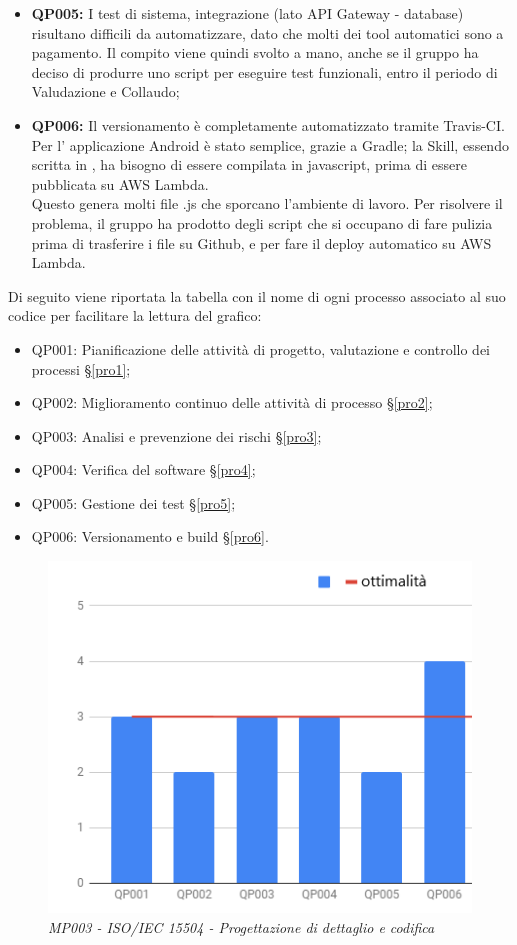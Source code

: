 \begin{itemize}
	\item \textbf{QP005:} I test di sistema, integrazione (lato API Gateway - database) risultano difficili da automatizzare, dato che molti dei tool automatici sono a pagamento. Il compito viene quindi svolto a mano, anche se il gruppo ha deciso di produrre uno script per eseguire test funzionali, entro il periodo di Valudazione e Collaudo;
	\item \textbf{QP006:} Il versionamento è completamente automatizzato tramite Travis-CI. Per l' applicazione Android è stato semplice, grazie a Gradle; la Skill, essendo scritta in , ha bisogno di essere compilata in javascript, prima di essere pubblicata su AWS Lambda. \\Questo genera molti file .js che sporcano l'ambiente di lavoro. Per risolvere il problema, il gruppo ha prodotto degli script che si occupano di fare pulizia prima di trasferire i file su Github, e per fare il deploy automatico su AWS Lambda.
\end{itemize}
Di seguito viene riportata la tabella con il nome di ogni processo associato al suo codice per facilitare la lettura del grafico:
\begin{itemize}
	\item QP001: Pianificazione delle attività di progetto, valutazione e controllo dei processi \S\ref{pro1};
	\item QP002: Miglioramento continuo delle attività di processo \S\ref{pro2};
	\item QP003: Analisi e prevenzione dei rischi \S\ref{pro3};
	\item QP004: Verifica del software \S\ref{pro4};
	\item QP005: Gestione dei test \S\ref{pro5};
	\item QP006: Versionamento e build \S\ref{pro6}.
\end{itemize}
\begin{figure}[H]
    \centering
	\includegraphics[scale=0.7]{./images/spicePDC.png}
    \caption{\textit{MP003 - ISO/IEC 15504 - Progettazione di dettaglio e codifica}}
\end{figure}


